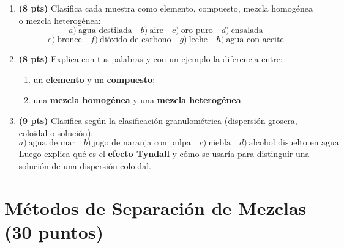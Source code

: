\documentclass[12pt, letterpaper]{article}
\begin{document}
\begin{enumerate}[leftmargin=*]
  \item \textbf{(8 pts)} Clasifica cada muestra como elemento, compuesto, mezcla homogénea o mezcla heterogénea:
        \[
          a)\ \text{agua destilada} \quad b)\ \text{aire} \quad c)\ \text{oro puro} \quad d)\ \text{ensalada}
        \]
        \[
          e)\ \text{bronce} \quad f)\ \text{dióxido de carbono} \quad g)\ \text{leche} \quad h)\ \text{agua con aceite}
        \]

  \item \textbf{(8 pts)} Explica con tus palabras y con un ejemplo la diferencia entre:
        \begin{enumerate}[label=\alph*)]
          \item un \textbf{elemento} y un \textbf{compuesto};
          \item una \textbf{mezcla homogénea} y una \textbf{mezcla heterogénea}.
        \end{enumerate}

  \item \textbf{(9 pts)} Clasifica según la clasificación granulométrica (dispersión grosera, coloidal o solución):
        \[
          a)\ \text{agua de mar} \quad b)\ \text{jugo de naranja con pulpa} \quad c)\ \text{niebla} \quad d)\ \text{alcohol disuelto en agua}
        \]
        Luego explica qué es el \textbf{efecto Tyndall} y cómo se usaría para distinguir una solución de una dispersión coloidal.
\end{enumerate}

\newpage

\section{Métodos de Separación de Mezclas (30 puntos)}
\end{document}
